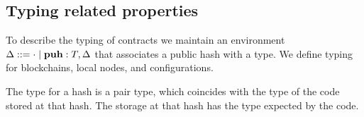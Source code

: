 \documentclass[runningheads]{llncs}
\begin{document}
\subsection{Typing related properties}
To describe the typing of contracts we maintain an environment
$\Delta ::= \EmptyEnv \mid \PUH: \TYPE, \Delta$ that associates a
public hash with a type.
We define typing for blockchains, local nodes, and configurations.
\begin{mathpar}
\end{mathpar}
The type for a hash is a pair type, which coincides with the type of
the code stored at that hash. The storage at that hash has the type
expected by the code.
\begin{mathpar}

\end{mathpar}
\end{document}
